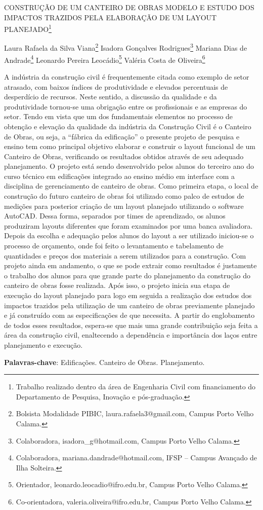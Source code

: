 \documentclass[article,12pt,onesidea,4paper,english,brazil]{abntex2}
\begin{document}
	
	
	\frenchspacing 
	
	\begin{center}
		\LARGE CONSTRUÇÃO DE UM CANTEIRO DE OBRAS MODELO E ESTUDO DOS
		IMPACTOS TRAZIDOS PELA ELABORAÇÃO DE UM LAYOUT PLANEJADO\footnote{Trabalho realizado dentro da área de Engenharia Civil com financiamento do Departamento de
			Pesquisa, Inovação e pós-graduação.}
		
		\normalsize
	Laura Rafaela da Silva Viana\footnote{Bolsista Modalidade PIBIC, laura.rafaela3@gmail.com, Campus Porto Velho Calama.} 
		Isadora Gonçalves Rodrigues\footnote{Colaboradora, isadora\_g@hotmail.com, Campus Porto Velho Calama.} 
	Mariana Dias de Andrade\footnote{Colaboradora, mariana.dandrade@hotmail.com, IFSP – Campus Avançado de Ilha Solteira.} 
	Leonardo
	Pereira Leocádio\footnote{Orientador, leonardo.leocadio@ifro.edu.br, Campus Porto Velho Calama.} 
		Valéria Costa de Oliveira\footnote{Co-orientadora, valeria.oliveira@ifro.edu.br, Campus Porto Velho Calama.}
	\end{center}
	
	\noindent 
	A indústria da construção civil é frequentemente citada como exemplo de setor
	atrasado, com baixos índices de produtividade e elevados percentuais de
	desperdício de recursos. Neste sentido, a discussão da qualidade e da produtividade
	tornou-se uma obrigação entre os profissionais e as empresas do setor. Tendo em
	vista que um dos fundamentais elementos no processo de obtenção e elevação da
	qualidade da indústria da Construção Civil é o Canteiro de Obras, ou seja, a “fábrica
	da edificação” o presente projeto de pesquisa e ensino tem como principal objetivo
	elaborar e construir o layout funcional de um Canteiro de Obras, verificando os
	resultados obtidos através de seu adequado planejamento. O projeto está sendo
	desenvolvido pelos alunos do terceiro ano do curso técnico em edificações integrado
	ao ensino médio em interface com a disciplina de gerenciamento de canteiro de
	obras. Como primeira etapa, o local de construção do futuro canteiro de obras foi
	utilizado como palco de estudos de medições para posterior criação de um layout
	planejado utilizando o software AutoCAD. Dessa forma, separados por times de
	aprendizado, os alunos produziram layouts diferentes que foram examinados por
	uma banca avaliadora. Depois da escolha e adequação pelos alunos do layout a ser
	utilizado iniciou-se o processo de orçamento, onde foi feito o levantamento e
	tabelamento de quantidades e preços dos materiais a serem utilizados para a
	construção. Com projeto ainda em andamento, o que se pode extrair como
	resultados é justamente o trabalho dos alunos para que grande parte do
	planejamento da construção do canteiro de obras fosse realizada. Após isso, o
	projeto inicia sua etapa de execução do layout planejado para logo em seguida a
	realização dos estudos dos impactos trazidos pela utilização de um canteiro de
	obras previamente planejado e já construído com as especificações de que
	necessita. A partir do englobamento de todos esses resultados, espera-se que mais
	uma grande contribuição seja feita a área da construção civil, enaltecendo a
	dependência e importância dos laços entre planejamento e execução.
	
	\vspace{\onelineskip}
	
	\noindent
	\textbf{Palavras-chave}: Edificações. Canteiro de Obras. Planejamento.
	
\end{document}
